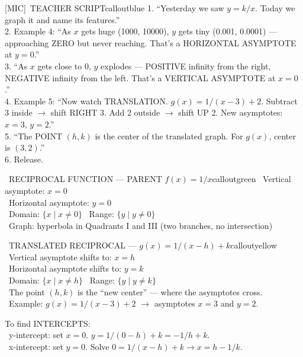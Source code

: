\documentclass[11pt]{article}
\newcommand{\IconMic}{[MIC]}
\begin{document}
\begin{callout}{\IconMic\ TEACHER SCRIPT}{calloutblue}
1. ``Yesterday we saw \(y = k/x\). Today we graph it and name its features.''\\
2. Example 4: ``As \(x\) gets huge (1000, 10000), \(y\) gets tiny (0.001, 0.0001) --- approaching ZERO but never reaching. That's a HORIZONTAL ASYMPTOTE at \(y = 0\).''\\
3. ``As \(x\) gets close to 0, \(y\) explodes --- POSITIVE infinity from the right, NEGATIVE infinity from the left. That's a VERTICAL ASYMPTOTE at \(x = 0\).''\\
4. Example 5: ``Now watch TRANSLATION. \(g(x) = 1/(x-3) + 2\). Subtract 3 inside \(\rightarrow\) shift RIGHT 3. Add 2 outside \(\rightarrow\) shift UP 2. New asymptotes: \(x = 3\), \(y = 2\).''\\
5. ``The POINT \((h, k)\) is the center of the translated graph. For \(g(x)\), center is \((3, 2)\).''\\
6. Release.
\end{callout}

\begin{callout}{\IconBook\ RECIPROCAL FUNCTION --- PARENT \(f(x) = 1/x\)}{calloutgreen}
\textbullet\ Vertical asymptote: \(x = 0\)\\
\textbullet\ Horizontal asymptote: \(y = 0\)\\
\textbullet\ Domain: \(\{x \mid x \neq 0\}\) \hspace{1.8em} \textbullet\ Range: \(\{y \mid y \neq 0\}\)\\
\textbullet\ Graph: hyperbola in Quadrants I and III (two branches, no intersection)
\end{callout}

\begin{callout}{\IconBook\ TRANSLATED RECIPROCAL --- \(g(x) = 1/(x-h) + k\)}{calloutyellow}
\textbullet\ Vertical asymptote shifts to: \(x = h\)\\
\textbullet\ Horizontal asymptote shifts to: \(y = k\)\\
\textbullet\ Domain: \(\{x \mid x \neq h\}\) \hspace{1.8em} \textbullet\ Range: \(\{y \mid y \neq k\}\)\\
\textbullet\ The point \((h, k)\) is the ``new center'' --- where the asymptotes cross.\\
\textbullet\ Example: \(g(x) = 1/(x-3) + 2\) \(\rightarrow\) asymptotes \(x = 3\) and \(y = 2\).

\medskip
To find INTERCEPTS:\\
\hspace*{1.5em}\textbullet\ y-intercept: set \(x = 0\). \(y = 1/(0-h) + k = -1/h + k.\)\\
\hspace*{1.5em}\textbullet\ x-intercept: set \(y = 0\). Solve \(0 = 1/(x-h) + k \rightarrow x = h - 1/k.\)
\end{callout}
\end{document}
